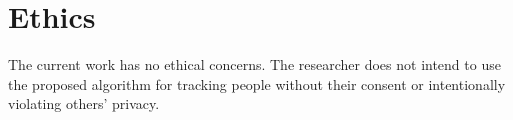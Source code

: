 


\chapter{Ethics}

\label{chapter:ethics}

The current work has no ethical concerns. The researcher does not intend to use the proposed algorithm for tracking people without their consent or intentionally violating others' privacy.



